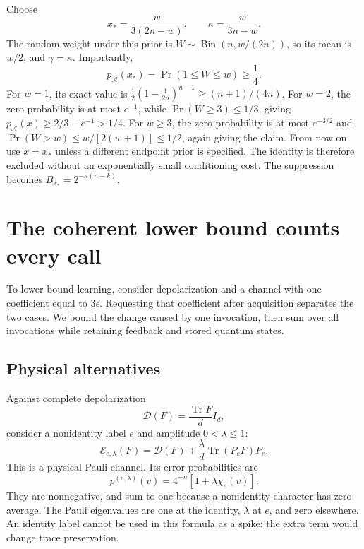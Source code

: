 \documentclass[11pt,a4paper]{article}
\numberwithin{equation}{section}
\theoremstyle{definition}
\theoremstyle{remark}
\newcommand{\Dep}{\mathcal D}
\begin{document}
Choose
\begin{equation}
 x_*=\frac{w}{3(2n-w)},\qquad
 \kappa=\frac{w}{3n-w}.
 \label{eq:plmt-kappa}
\end{equation}
The random weight under this prior is
\(W\sim\operatorname{Bin}(n,w/(2n))\), so its mean is \(w/2\), and
\(\gamma=\kappa\). Importantly,
\begin{equation}
 p_{\mathcal A}(x_*)=\Pr(1\leq W\leq w)\geq\frac14.
 \label{eq:plmt-mass}
\end{equation}
For \(w=1\), its exact value is
\(\frac12(1-\frac1{2n})^{n-1}\geq(n+1)/(4n)\).
For \(w=2\), the zero probability is at most \(e^{-1}\), while
\(\Pr(W\geq3)\leq1/3\), giving \(p_{\mathcal A}(x)\geq2/3-e^{-1}>1/4\).
For \(w\geq3\), the zero probability is at most \(e^{-3/2}\) and
\(\Pr(W>w)\leq w/[2(w+1)]\leq1/2\), again giving the claim.
From now on use \(x=x_*\) unless a different endpoint prior is specified. The identity is therefore excluded without an exponentially small conditioning cost. The suppression becomes \(B_{x_*}=2^{-\kappa (n-k)}\).

\section{The coherent lower bound counts every call}
To lower-bound learning, consider depolarization and a channel with one coefficient equal to \(3\epsilon\). Requesting that coefficient after acquisition separates the two cases. We bound the change caused by one invocation, then sum over all invocations while retaining feedback and stored quantum states.
\subsection{Physical alternatives}
Against complete depolarization
\[
 \Dep(F)=\frac{\operatorname{Tr}F}{d}I_d,
\]
consider a nonidentity label \(e\) and amplitude \(0<\lambda\leq1\):
\begin{equation}
 \mathcal E_{e,\lambda}(F)=
 \Dep(F)+\frac{\lambda}{d}\operatorname{Tr}(P_eF)P_e.
 \label{eq:plmt-spike}
\end{equation}
This is a physical Pauli channel. Its error probabilities are
\[
 p^{(e,\lambda)}(v)=4^{-n}[1+\lambda\chi_e(v)].
\]
They are nonnegative, and sum to one because a nonidentity character has zero average. The Pauli eigenvalues are one at the identity, \(\lambda\) at \(e\), and zero elsewhere. An identity label cannot be used in this formula as a spike: the extra term would change trace preservation.
\end{document}

